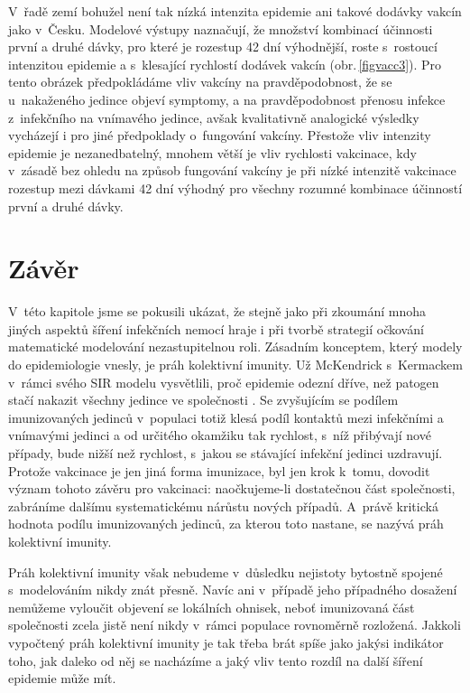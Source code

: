 V~řadě zemí bohužel není tak nízká intenzita epidemie ani takové dodávky vakcín jako v~Česku. Modelové výstupy naznačují, že množství kombinací účinnosti první a druhé dávky, pro které je rozestup 42 dní výhodnější, roste s~rostoucí intenzitou epidemie a s~klesající rychlostí dodávek vakcín (obr.\,\ref{figvacc3}). Pro tento obrázek předpokládáme vliv vakcíny na pravděpodobnost, že se u~nakaženého jedince objeví symptomy, a na pravděpodobnost přenosu infekce z~infekčního na vnímavého jedince, avšak kvalitativně analogické výsledky vycházejí i pro jiné předpoklady o~fungování vakcíny. Přestože vliv intenzity epidemie je nezanedbatelný, mnohem větší je vliv rychlosti vakcinace, kdy v~zásadě bez ohledu na způsob fungování vakcíny je při nízké intenzitě vakcinace rozestup mezi dávkami 42 dní výhodný pro všechny rozumné kombinace účinností první a druhé dávky.



\section*{Závěr}

V~této kapitole jsme se pokusili ukázat, že stejně jako při zkoumání mnoha jiných aspektů šíření infekčních nemocí hraje i při tvorbě strategií očkování matematické modelování nezastupitelnou roli. Zásadním konceptem, který modely do epidemiologie vnesly, je práh kolektivní imunity. Už McKendrick s~Kermackem v~rámci svého SIR modelu vysvětlili, proč epidemie odezní dříve, než patogen stačí nakazit všechny jedince ve společnosti \cite[viz také kapitolu \ref{Typy_modelu}]{Bacaer2011}. Se zvyšujícím se podílem imunizovaných jedinců v~populaci totiž klesá podíl kontaktů mezi infekčními a vnímavými jedinci a od určitého okamžiku tak rychlost, s~níž přibývají nové případy, bude nižší než rychlost, s~jakou se stávající infekční jedinci uzdravují. Protože vakcinace je jen jiná forma imunizace, byl jen krok k~tomu, dovodit význam tohoto závěru pro vakcinaci: naočkujeme-li dostatečnou část společnosti, zabráníme dalšímu systematickému nárůstu nových případů. A~právě kritická hodnota podílu imunizovaných jedinců, za kterou toto nastane, se nazývá práh kolektivní imunity.

Práh kolektivní imunity však nebudeme v~důsledku nejistoty bytostně spojené s~modelováním nikdy znát přesně. Navíc ani v~případě jeho případného dosažení nemůžeme vyloučit objevení se lokálních ohnisek, neboť imunizovaná část společnosti zcela jistě není nikdy v~rámci populace rovnoměrně rozložená. Jakkoli vypočtený práh kolektivní imunity je tak třeba brát spíše jako jakýsi indikátor toho, jak daleko od něj se nacházíme a jaký vliv tento rozdíl na další šíření epidemie může mít. 

